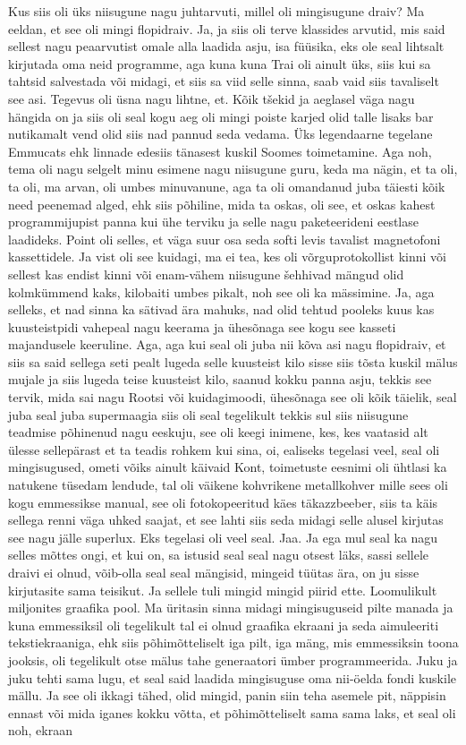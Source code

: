 Kus siis oli üks niisugune nagu juhtarvuti, millel oli mingisugune draiv? Ma eeldan, et see oli mingi flopidraiv. Ja, ja siis oli terve klassides arvutid, mis said sellest nagu peaarvutist omale alla laadida asju, isa füüsika, eks ole seal lihtsalt kirjutada oma neid programme, aga kuna kuna Trai oli ainult üks, siis kui sa tahtsid salvestada või midagi, et siis sa viid selle sinna, saab vaid siis tavaliselt see asi. Tegevus oli üsna nagu lihtne, et.
Kõik tšekid ja aeglasel väga nagu hängida on ja siis oli seal kogu aeg oli mingi poiste karjed olid talle lisaks bar nutikamalt vend olid siis nad pannud seda vedama. Üks legendaarne tegelane Emmucats ehk linnade edesiis tänasest kuskil Soomes toimetamine. Aga noh, tema oli nagu selgelt minu esimene nagu niisugune guru, keda ma nägin, et ta oli, ta oli, ma arvan, oli umbes minuvanune, aga ta oli omandanud juba täiesti kõik need peenemad alged, ehk siis põhiline, mida ta oskas, oli see, et oskas kahest programmijupist panna kui ühe terviku ja selle nagu paketeerideni eestlase laadideks. Point oli selles, et väga suur osa seda softi levis tavalist magnetofoni kassettidele. Ja vist oli see kuidagi, ma ei tea, kes oli võrguprotokollist kinni või sellest kas endist kinni või enam-vähem niisugune šehhivad mängud olid kolmkümmend kaks, kilobaiti umbes pikalt, noh see oli ka mässimine. Ja, aga selleks, et nad sinna ka sätivad ära mahuks, nad olid tehtud pooleks kuus kas kuusteistpidi vahepeal nagu keerama ja ühesõnaga see kogu see kasseti majandusele keeruline. Aga, aga kui seal oli juba nii kõva asi nagu flopidraiv, et siis sa said sellega seti pealt lugeda selle kuusteist kilo sisse siis tõsta kuskil mälus mujale ja siis lugeda teise kuusteist kilo, saanud kokku panna asju, tekkis see tervik, mida sai nagu Rootsi või kuidagimoodi, ühesõnaga see oli kõik täielik, seal juba seal juba supermaagia siis oli seal tegelikult tekkis sul siis niisugune teadmise põhinenud nagu eeskuju, see oli keegi inimene, kes, kes vaatasid alt ülesse sellepärast et ta teadis rohkem kui sina, oi, ealiseks tegelasi veel, seal oli mingisugused, ometi võiks ainult käivaid Kont, toimetuste eesnimi oli ühtlasi ka natukene tüsedam lendude, tal oli väikene kohvrikene metallkohver mille sees oli kogu emmessikse manual, see oli fotokopeeritud käes täkazzbeeber, siis ta käis sellega renni väga uhked saajat, et see lahti siis seda midagi selle alusel kirjutas see nagu jälle superlux. Eks tegelasi oli veel seal. Jaa. Ja ega mul seal ka nagu selles mõttes ongi, et kui on, sa istusid seal seal nagu otsest läks, sassi sellele draivi ei olnud, võib-olla seal seal mängisid, mingeid tüütas ära, on ju sisse kirjutasite sama teisikut. Ja sellele tuli mingid mingid piirid ette. Loomulikult miljonites graafika pool. Ma üritasin sinna midagi mingisuguseid pilte manada ja kuna emmessiksil oli tegelikult tal ei olnud graafika ekraani ja seda aimuleeriti tekstiekraaniga, ehk siis põhimõtteliselt iga pilt, iga mäng, mis emmessiksin toona jooksis, oli tegelikult otse mälus tahe generaatori ümber programmeerida. Juku ja juku tehti sama lugu, et seal said laadida mingisuguse oma nii-öelda fondi kuskile mällu. Ja see oli ikkagi tähed, olid mingid, panin siin teha asemele pit, näppisin ennast või mida iganes kokku võtta, et põhimõtteliselt sama sama laks, et seal oli noh, ekraan 